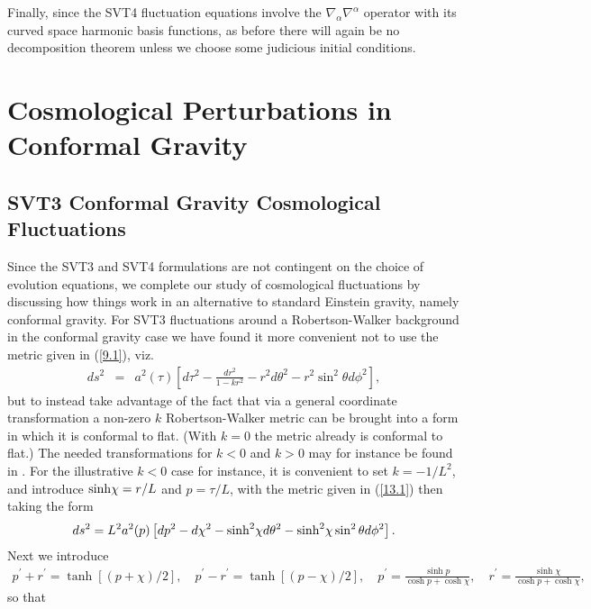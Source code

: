 \documentclass[aps,onecolumn,10pt]{revtex4}
\numberwithin{equation}{section}
\numberwithin{equation}{section}
\begin{document}
Finally, since the SVT4 fluctuation equations involve the $\nabla_{\alpha }\nabla^{\alpha }$ operator with its curved space harmonic basis functions, as before there will again be no decomposition theorem unless we choose some judicious initial conditions.

\section{Cosmological Perturbations in Conformal Gravity}
\label{S13}

\subsection{SVT3 Conformal Gravity Cosmological Fluctuations}

Since the SVT3 and SVT4 formulations are not contingent on the choice of evolution equations, we complete our study of cosmological fluctuations by discussing how things work in an alternative to standard Einstein gravity, namely conformal gravity.  For SVT3 fluctuations around a Robertson-Walker background in the conformal gravity case  we have found it more convenient not to use the metric given in (\ref{9.1}), viz.
% 
\begin{eqnarray}
ds^2&=&a^2(\tau)\left[d\tau^2-\frac{dr^2}{1-kr^2}-r^2d\theta^2-r^2\sin^2\theta d\phi^2\right],
\label{13.1}
\end{eqnarray}
% 
but to instead take advantage of the fact that via a general coordinate transformation a non-zero $k$ Robertson-Walker metric can be brought into a form in which it is conformal to flat. (With $k=0$ the metric already is conformal to flat.) The needed transformations for $k<0$ and $k>0$ may for instance be found in \cite{Amarasinghe2018}.  
For the illustrative $k<0$ case for instance, it is convenient to set $k=-1/L^2$, and introduce ${\rm sinh} \chi=r/L$ and $p=\tau/L$, with the  metric given in (\ref{13.1}) then taking the form
%
\begin{eqnarray}
ds^2=L^2a^2(p)\left[dp^2-d\chi^2 -{\rm sinh}^2\chi d\theta^2-{\rm sinh}^2\chi \sin^2\theta d\phi^2\right].
\label{13.2}
\end{eqnarray}
%
Next we introduce
%
\begin{eqnarray}
p^{\prime}+r^{\prime}=\tanh[(p+\chi)/2],\quad p^{\prime}-r^{\prime}=\tanh[(p-\chi)/2],\quad p^{\prime}=\frac{\sinh p}{\cosh p+\cosh \chi},\quad r^{\prime}=\frac{\sinh \chi}{\cosh p+\cosh \chi},
\label{13.3}
\end{eqnarray}
%
so that
\end{document}
